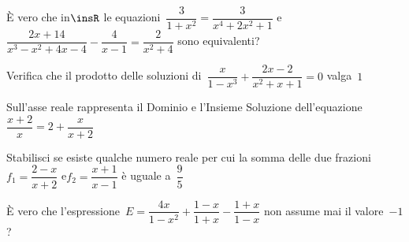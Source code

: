 \begin{esercizio}[\Ast]
 \label{ese:3.49}
È vero che in$\insR$ le equazioni~$\dfrac{3}{1 + x^{2}} = \dfrac{3}{x^{4} 
+2 x^{2} + 1}$ e~$\dfrac{2 x + 14}{x^{3}-x^{2} + 4 x-4}-\dfrac{4}{x-1} 
=\dfrac{2}{x^{2} + 4}$ sono equivalenti?
\end{esercizio}

\begin{esercizio}[\Ast]
 \label{ese:3.50}
Verifica che il prodotto delle soluzioni di~$\dfrac{x}{1-x^{3}} 
+ \dfrac{2 x-2}{x^{2} + x + 1}=0$ valga~$1$
\end{esercizio}

\begin{esercizio}[\Ast]
 \label{ese:3.51}
Sull'asse reale rappresenta il Dominio e l'Insieme Soluzione 
dell'equazione\\ 
$\dfrac{x + 2}{x}=2+\dfrac{x}{x + 2}$
\end{esercizio}

\begin{esercizio}[\Ast]
 \label{ese:3.52}
Stabilisci se esiste qualche numero reale per cui la somma delle due 
frazioni \\
$f_{1}=\dfrac{2-x}{x + 2}$ e$f_{2}=\dfrac{x + 1}{x-1}$ è uguale 
a~$\dfrac{9}{5}$
\end{esercizio}

\begin{esercizio}[\Ast]
 \label{ese:3.53}
È vero che l'espressione~$E=\dfrac{4 x}{1-x^{2}} + \dfrac{1-x}{1 + 
x}-\dfrac{1 + x}{1-x}$ non assume mai il valore~$-1$?
\end{esercizio}

